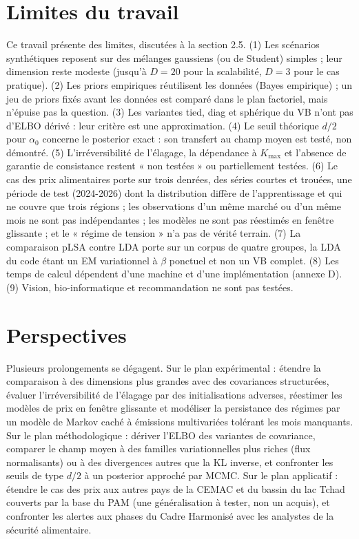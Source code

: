 \section*{Limites du travail}
Ce travail présente des limites, discutées à la section 2.5. (1) Les scénarios synthétiques reposent sur des mélanges gaussiens (ou de Student) simples ; leur dimension reste modeste (jusqu'à $D=20$ pour la scalabilité, $D=3$ pour le cas pratique). (2) Les priors empiriques réutilisent les données (Bayes empirique) ; un jeu de priors fixés avant les données est comparé dans le plan factoriel, mais n'épuise pas la question. (3) Les variantes tied, diag et sphérique du VB n'ont pas d'ELBO dérivé : leur critère est une approximation. (4) Le seuil théorique $d/2$ pour $\alpha_0$ concerne le posterior exact : son transfert au champ moyen est testé, non démontré. (5) L'irréversibilité de l'élagage, la dépendance à $K_{\max}$ et l'absence de garantie de consistance restent « non testées » ou partiellement testées. (6) Le cas des prix alimentaires porte sur trois denrées, des séries courtes et trouées, une période de test (2024-2026) dont la distribution diffère de l'apprentissage et qui ne couvre que trois régions ; les observations d'un même marché ou d'un même mois ne sont pas indépendantes ; les modèles ne sont pas réestimés en fenêtre glissante ; et le « régime de tension » n'a pas de vérité terrain. (7) La comparaison pLSA contre LDA porte sur un corpus de quatre groupes, la LDA du code étant un EM variationnel à $\beta$ ponctuel et non un VB complet. (8) Les temps de calcul dépendent d'une machine et d'une implémentation (annexe D). (9) Vision, bio-informatique et recommandation ne sont pas testées.

\section*{Perspectives}
Plusieurs prolongements se dégagent. Sur le plan expérimental : étendre la comparaison à des dimensions plus grandes avec des covariances structurées, évaluer l'irréversibilité de l'élagage par des initialisations adverses, réestimer les modèles de prix en fenêtre glissante et modéliser la persistance des régimes par un modèle de Markov caché à émissions multivariées tolérant les mois manquants. Sur le plan méthodologique : dériver l'ELBO des variantes de covariance, comparer le champ moyen à des familles variationnelles plus riches (flux normalisants) ou à des divergences autres que la KL inverse, et confronter les seuils de type $d/2$ à un posterior approché par MCMC. Sur le plan applicatif : étendre le cas des prix aux autres pays de la CEMAC et du bassin du lac Tchad couverts par la base du PAM (une généralisation à tester, non un acquis), et confronter les alertes aux phases du Cadre Harmonisé avec les analystes de la sécurité alimentaire.

